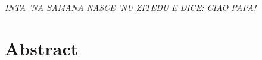 \documentclass[12pt,twoside]{report}
\begin{document}
\begin{titlepage}               

\thispagestyle{empty}                  
\topmargin=6.5cm                        
\raggedleft                            	
\large                                 		
\em                                    
INTA 'NA SAMANA NASCE 'NU ZITEDU E DICE: CIAO PAPA!
\newpage                            
\clearpage{\pagestyle{empty}\cleardoublepage}
\end{titlepage}
\chapter*{Abstract}             

%
\clearpage{\pagestyle{empty}\cleardoublepage}

\rhead[\fancyplain{}{\bfseries\leftmark}]{\fancyplain{}{\bfseries\thepage}}
\tableofcontents                        %


\clearpage{\pagestyle{empty}\cleardoublepage}
\listoffigures                          %
\clearpage{\pagestyle{empty}\cleardoublepage}
\listoftables                           %
\clearpage{\pagestyle{empty}\cleardoublepage}


\lhead[\fancyplain{}{\bfseries\thepage}]{\fancyplain{}{\bfseries\rightmark}}
\end{document}
